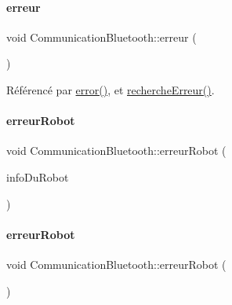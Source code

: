\paragraph{\texorpdfstring{erreur}{erreur}}
{\footnotesize\ttfamily void Communication\+Bluetooth\+::erreur (\begin{DoxyParamCaption}{ }\end{DoxyParamCaption})\hspace{0.3cm}{\ttfamily [signal]}}



Référencé par \hyperlink{class_communication_bluetooth_a6e0d7054012e11af9d55d6d4f5764259}{error()}, et \hyperlink{class_communication_bluetooth_ad9abca9e2e3fa0115cc92458a357e04d}{recherche\+Erreur()}.

\mbox{\label{class_communication_bluetooth_a9de64febd3f18753c559cc2e55df3cb1}} 
\paragraph{\texorpdfstring{erreur\+Robot}{erreurRobot}\hspace{0.1cm}{\footnotesize\ttfamily [1/2]}}
{\footnotesize\ttfamily void Communication\+Bluetooth\+::erreur\+Robot (\begin{DoxyParamCaption}\item[{Q\+String}]{info\+Du\+Robot }\end{DoxyParamCaption})\hspace{0.3cm}{\ttfamily [signal]}}

\mbox{\label{class_communication_bluetooth_a74bc2dc753fa3490a2847f3c9497e147}} 
\paragraph{\texorpdfstring{erreur\+Robot}{erreurRobot}\hspace{0.1cm}{\footnotesize\ttfamily [2/2]}}
{\footnotesize\ttfamily void Communication\+Bluetooth\+::erreur\+Robot (\begin{DoxyParamCaption}{ }\end{DoxyParamCaption})\hspace{0.3cm}{\ttfamily [signal]}}



